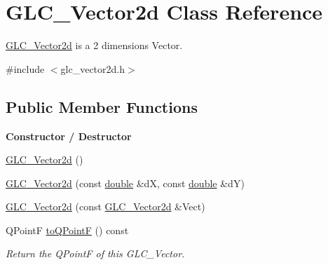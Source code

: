 \hypertarget{class_g_l_c___vector2d}{\section{G\-L\-C\-\_\-\-Vector2d Class Reference}
\label{class_g_l_c___vector2d}
}


\hyperlink{class_g_l_c___vector2d}{G\-L\-C\-\_\-\-Vector2d} is a 2 dimensions Vector.  




{\ttfamily \#include $<$glc\-\_\-vector2d.\-h$>$}

\subsection*{Public Member Functions}
\begin{Indent}{\bf Constructor / Destructor}\par
\begin{DoxyCompactItemize}
\item 
\hyperlink{class_g_l_c___vector2d_a6c8cfd813f2e23a0bb979bd7cafa8aa5}{G\-L\-C\-\_\-\-Vector2d} ()
\item 
\hyperlink{class_g_l_c___vector2d_ab4d0504ed0993cc36c9f9a1a58a0de2b}{G\-L\-C\-\_\-\-Vector2d} (const \hyperlink{_super_l_u_support_8h_a8956b2b9f49bf918deed98379d159ca7}{double} \&d\-X, const \hyperlink{_super_l_u_support_8h_a8956b2b9f49bf918deed98379d159ca7}{double} \&d\-Y)
\item 
\hyperlink{class_g_l_c___vector2d_af9007aa6e8cf9c01ebf3f7f36194c565}{G\-L\-C\-\_\-\-Vector2d} (const \hyperlink{class_g_l_c___vector2d}{G\-L\-C\-\_\-\-Vector2d} \&Vect)
\item 
Q\-Point\-F \hyperlink{class_g_l_c___vector2d_a252514cfd4f4680c7de1a6da45bfaa57}{to\-Q\-Point\-F} () const 
\begin{DoxyCompactList}\small\item\em Return the Q\-Point\-F of this G\-L\-C\-\_\-\-Vector. \end{DoxyCompactList}\end{DoxyCompactItemize}
\end{Indent}
